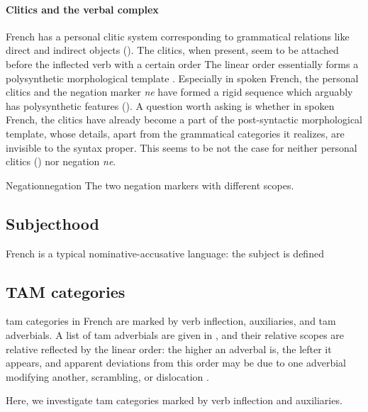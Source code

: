\documentclass[a4paper, oneside, 12pt]{report}
\newcommand*{\citepage}[1]{p.~{#1}}
\newcommand*{\citepages}[1]{pp.~{#1}}
\newcommand{\form}[1]{\emph{#1}}
\begin{document}
\paragraph*{Clitics and the verbal complex}\label{sec:grammatical.clause.top-level.verbal-complex}
French has a personal clitic system corresponding to grammatical relations like 
direct and indirect objects ().
The clitics, when present, seem to be attached before the inflected verb with a certain order
The linear order essentially forms a polysynthetic morphological template
\citep[\citepage{128}]{rowlett2007syntax}.
Especially in spoken French, the personal clitics and the negation marker \form{ne}
have formed a rigid sequence which arguably has polysynthetic features
().
A question worth asking is whether in spoken French,
the clitics have already become a part of the post-syntactic morphological template,
whose details, apart from the grammatical categories it realizes,
are invisible to the syntax proper.
This seems to be not the case for neither personal clitics () nor negation \form{ne}.

\begin{todobox}{Negation}{negation}
    The two negation markers with different scopes.
\end{todobox}



\subsection{Subjecthood}

French is a typical nominative-accusative language:
the subject is defined 

\subsection{TAM categories}\label{sec:grammatical.clause.tam}
\ac{tam} categories in French are marked by verb inflection, auxiliaries,
and \ac{tam} adverbials.
A list of \ac{tam} adverbials are given in \citet[\citepage{103, (3)}]{rowlett2007syntax},
and their relative scopes are relative reflected by the linear order:
the higher an adverbal is, the lefter it appears,
and apparent deviations from this order may be due to 
one adverbial modifying another,
scrambling, or dislocation \citep[\citepages{104-105}]{rowlett2007syntax}.

Here, we investigate \ac{tam} categories marked by verb inflection and auxiliaries.
\end{document}

